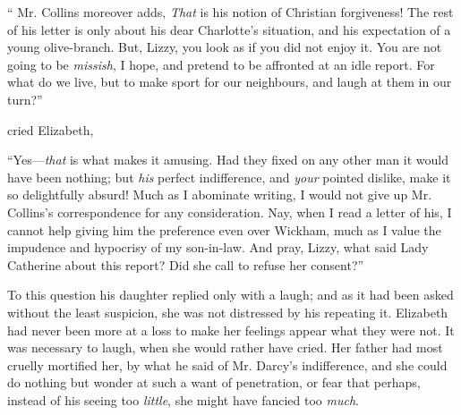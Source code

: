 

“ Mr. Collins moreover adds,  {\em That} is his notion of Christian forgiveness! The rest of his letter is only about his dear Charlotte's situation, and his expectation of a young olive-branch. But, Lizzy, you look as if you did not enjoy it. You are not going to be {\em missish}, I hope, and pretend to be affronted at an idle report. For what do we live, but to make sport for our neighbours, and laugh at them in our turn?”

 cried Elizabeth, 

“Yes---{\em that} is what makes it amusing. Had they fixed on any other man it would have been nothing; but {\em his} perfect indifference, and {\em your} pointed dislike, make it so delightfully absurd! Much as I abominate writing, I would not give up Mr. Collins's correspondence for any consideration. Nay, when I read a letter of his, I cannot help giving him the preference even over Wickham, much as I value the impudence and hypocrisy of my son-in-law. And pray, Lizzy, what said Lady Catherine about this report? Did she call to refuse her consent?”

To this question his daughter replied only with a laugh; and as it had been asked without the least suspicion, she was not distressed by his repeating it. Elizabeth had never been more at a loss to make her feelings appear what they were not. It was necessary to laugh, when she would rather have cried. Her father had most cruelly mortified her, by what he said of Mr. Darcy's indifference, and she could do nothing but wonder at such a want of penetration, or fear that perhaps, instead of his seeing too {\em little}, she might have fancied too {\em much}.

